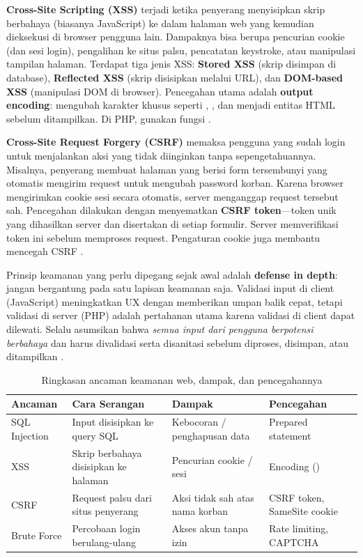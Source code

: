 \textbf{Cross-Site Scripting (XSS)} terjadi ketika penyerang menyisipkan skrip berbahaya (biasanya JavaScript) ke dalam halaman web yang kemudian dieksekusi di browser pengguna lain. Dampaknya bisa berupa pencurian cookie (dan sesi login), pengalihan ke situs palsu, pencatatan keystroke, atau manipulasi tampilan halaman. Terdapat tiga jenis XSS: \textbf{Stored XSS} (skrip disimpan di database), \textbf{Reflected XSS} (skrip disisipkan melalui URL), dan \textbf{DOM-based XSS} (manipulasi DOM di browser). Pencegahan utama adalah \textbf{output encoding}: mengubah karakter khusus seperti \code{<}, \code{>}, dan  menjadi entitas HTML sebelum ditampilkan. Di PHP, gunakan fungsi  \cite{owaspXss}.

\textbf{Cross-Site Request Forgery (CSRF)} memaksa pengguna yang sudah login untuk menjalankan aksi yang tidak diinginkan tanpa sepengetahuannya. Misalnya, penyerang membuat halaman yang berisi form tersembunyi yang otomatis mengirim request untuk mengubah password korban. Karena browser mengirimkan cookie sesi secara otomatis, server menganggap request tersebut sah. Pencegahan dilakukan dengan menyematkan \textbf{CSRF token}---token unik yang dihasilkan server dan disertakan di setiap formulir. Server memverifikasi token ini sebelum memproses request. Pengaturan cookie  juga membantu mencegah CSRF \cite{owaspCsrf}.

Prinsip keamanan yang perlu dipegang sejak awal adalah \textbf{defense in depth}: jangan bergantung pada satu lapisan keamanan saja. Validasi input di client (JavaScript) meningkatkan UX dengan memberikan umpan balik cepat, tetapi validasi di server (PHP) adalah pertahanan utama karena validasi di client dapat dilewati. Selalu asumsikan bahwa \textit{semua input dari pengguna berpotensi berbahaya} dan harus divalidasi serta disanitasi sebelum diproses, disimpan, atau ditampilkan \cite{phpRightWay}.

\begin{table}[H]
\centering
\begin{tabular}{|P{2.5cm}|P{3.5cm}|P{2.5cm}|P{3.8cm}|}
\hline
\textbf{Ancaman} & \textbf{Cara Serangan} & \textbf{Dampak} & \textbf{Pencegahan} \\
\hline
SQL Injection & Input disisipkan ke query SQL & Kebocoran / penghapusan data & Prepared statement \\
\hline
XSS & Skrip berbahaya disisipkan ke halaman & Pencurian cookie / sesi & Encoding () \\
\hline
CSRF & Request palsu dari situs penyerang & Aksi tidak sah atas nama korban & CSRF token, SameSite cookie \\
\hline
Brute Force & Percobaan login berulang-ulang & Akses akun tanpa izin & Rate limiting, CAPTCHA \\
\hline
\end{tabular}
\caption{Ringkasan ancaman keamanan web, dampak, dan pencegahannya}
\end{table}

